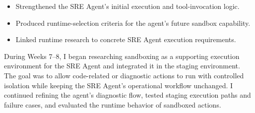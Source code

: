 
\begin{itemize}
    \item Strengthened the SRE Agent's initial execution and tool-invocation logic.
    \item Produced runtime-selection criteria for the agent's future sandbox capability.
    \item Linked runtime research to concrete SRE Agent execution requirements.
\end{itemize}


During Weeks 7--8, I began researching sandboxing as a supporting execution environment for the SRE Agent and integrated it in the staging environment. The goal was to allow code-related or diagnostic actions to run with controlled isolation while keeping the SRE Agent's operational workflow unchanged. I continued refining the agent's diagnostic flow, tested staging execution paths and failure cases, and evaluated the runtime behavior of sandboxed actions.


